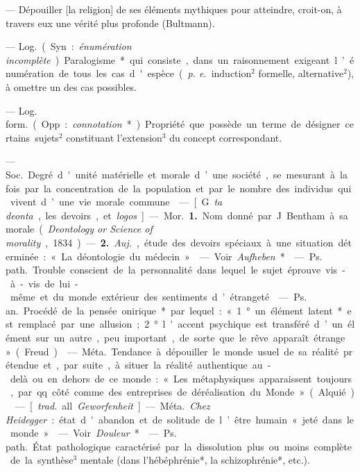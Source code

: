 \begin{itemize}[leftmargin=1cm, label=, itemsep=1pt]
 — Dépouiller [la religion] de ses éléments mythiques pour
atteindre, croit-on, à travers eux une vérité plus profonde (Bultmann).

 — \si{Log.} (Syn. : {\it énumération incomplète}).
Paralogisme* qui consiste, dans un
raisonnement exigeant l’énumération de tous les cas d'espèce ({\it p. e.}
induction$^2$ formelle, alternative$^2$), à omettre un des cas possibles.

 — \si{Log. form.} (Opp. : {\it connotation}*). 
Propriété que possède un terme de désigner certains sujets$^2$
constituant l'extension$^3$ du concept correspondant.

 — \si{Soc.} Degré d'unité
matérielle et morale d’une société,
se mesurant à la fois par la concentration de la population et par le
nombre des individus qui vivent
d’une vie morale commune.

 — [G. {\it ta deonta}, les devoirs,
et {\it logos}] — \si{Mor.} {\bf 1.} Nom donné par
J. Bentham à sa morale ({\it Deontology
or Science of morality}, 1834). —
 {\bf 2.} {\it Auj.}, étude des devoirs spéciaux
à une situation déterminée : « La
déontologie du médecin ».

 — Voir {\it Aufheben}*.

 — \si{Ps. path.}
Trouble conscient de la personnalité
dans lequel le sujet éprouve vis-à-vis
de lui-même et du monde extérieur
des sentiments d’étrangeté.

 — \si{Ps. an.} Procédé de la
pensée onirique* par lequel : « 1° un
élément latent* est remplacé par
une allusion ; 2° l'accent psychique
est transféré d’un élément sur un
autre, peu important, de sorte que
le rêve apparaît étrange » (Freud).

 — \si{Méta.} Tendance à
dépouiller le monde usuel de sa
réalité prétendue et, par suite, à
situer la réalité authentique au-delà ou en dehors de ce monde :
« Les métaphysiques apparaissent
toujours, par qq. côté comme des
entreprises de déréalisation du
Monde » (Alquié).

 — [{\it trad.} all. {\it Geworfenheit}] —
\si{Méta.} {\it Chez Heidegger} : état d'abandon
et de solitude de l’être humain « jeté
dans le monde ».

 — Voir {\it Douleur}*.

 — \si{Ps. path.}
État pathologique caractérisé par la
dissolution plus ou moins complète
de la synthèse$^3$ mentale (dans
l'hébéphrénie*, la schizophrénie*,
etc.).


\end{itemize}
